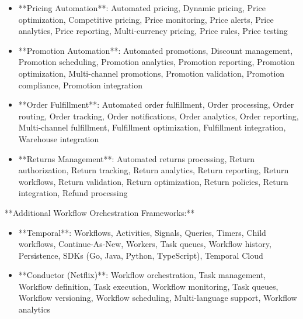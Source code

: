 \documentclass[11pt,a4paper]{article}
\begin{document}
\begin{itemize}
\item **Pricing Automation**: Automated pricing, Dynamic pricing, Price optimization, Competitive pricing, Price monitoring, Price alerts, Price analytics, Price reporting, Multi-currency pricing, Price rules, Price testing
\end{itemize}

\begin{itemize}
\item **Promotion Automation**: Automated promotions, Discount management, Promotion scheduling, Promotion analytics, Promotion reporting, Promotion optimization, Multi-channel promotions, Promotion validation, Promotion compliance, Promotion integration
\end{itemize}

\begin{itemize}
\item **Order Fulfillment**: Automated order fulfillment, Order processing, Order routing, Order tracking, Order notifications, Order analytics, Order reporting, Multi-channel fulfillment, Fulfillment optimization, Fulfillment integration, Warehouse integration
\end{itemize}

\begin{itemize}
\item **Returns Management**: Automated returns processing, Return authorization, Return tracking, Return analytics, Return reporting, Return workflows, Return validation, Return optimization, Return policies, Return integration, Refund processing
\end{itemize}

**Additional Workflow Orchestration Frameworks:**

\begin{itemize}
\item **Temporal**: Workflows, Activities, Signals, Queries, Timers, Child workflows, Continue-As-New, Workers, Task queues, Workflow history, Persistence, SDKs (Go, Java, Python, TypeScript), Temporal Cloud
\end{itemize}

\begin{itemize}
\item **Conductor (Netflix)**: Workflow orchestration, Task management, Workflow definition, Task execution, Workflow monitoring, Task queues, Workflow versioning, Workflow scheduling, Multi-language support, Workflow analytics
\end{itemize}
\end{document}
